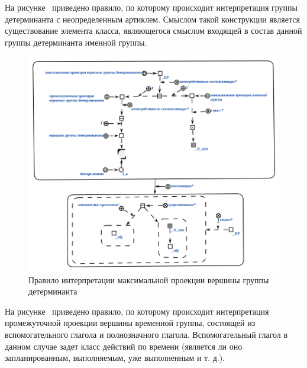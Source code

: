 На рисунке~\textit{} приведено правило, по которому происходит интерпретация группы детерминанта с неопределенным артиклем.
Смыслом такой конструкции является существование элемента класса, являющегося смыслом входящей в состав данной группы детерминанта именной группы.

\begin{figure}[h]
    \centering
    \includegraphics[scale=0.8]{images/part2/chapter_lang/d_sem_4}
    \caption{Правило интерпретации максимальной проекции вершины группы детерминанта}
    \label{d_sem_4}
\end{figure}

На рисунке~\textit{} приведено правило, по которому происходит интерпретация промежуточной проекции вершины временной группы, состоящей из вспомогательного глагола и полнозначного глагола.
Вспомогательный глагол в данном случае задет класс действий по времени (является ли оно запланированным, выполняемым, уже выполненным и т. д.).

